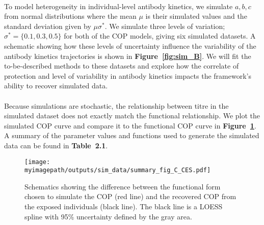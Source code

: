 \paragraph{}To model heterogeneity in individual-level antibody kinetics, we simulate $a, b, c$ from normal distributions where the mean $\mu$ is their simulated values and the standard deviation given by $\mu\sigma^*$. We simulate three levels of variation; $\sigma^* = \{0.1, 0.3, 0.5\}$ for both of the COP models, giving six simulated datasets. A schematic showing how these levels of uncertainty influence the variability of the antibody kinetics trajectories is shown in \textbf{Figure~\ref{fig:sim_B}}. We will fit the to-be-described methods to these datasets and explore how the correlate of protection and level of variability in antibody kinetics impacts the framework's ability to recover simulated data. 

\paragraph{}Because simulations are stochastic, the relationship between titre in the simulated dataset does not exactly match the functional relationship. We plot the simulated COP curve and compare it to the functional COP curve in \textbf{Figure~\ref{fig:sim_C}}. A summary of the parameter values and functions used to generate the simulated data can be found in \textbf{Table~2.1}.

\begin{figure}[h]
    \centering
    \texttt{[image: \\myimagepath/outputs/sim\_data/summary\_fig\_C\_CES.pdf]}     \caption{Schematics showing the difference between the functional form chosen to simulate the COP  (red line) and the recovered COP from the exposed individuals (black line). The black line is a LOESS spline with 95\% uncertainty defined by the gray area.     \label{fig:sim_C}  }

\end{figure}


